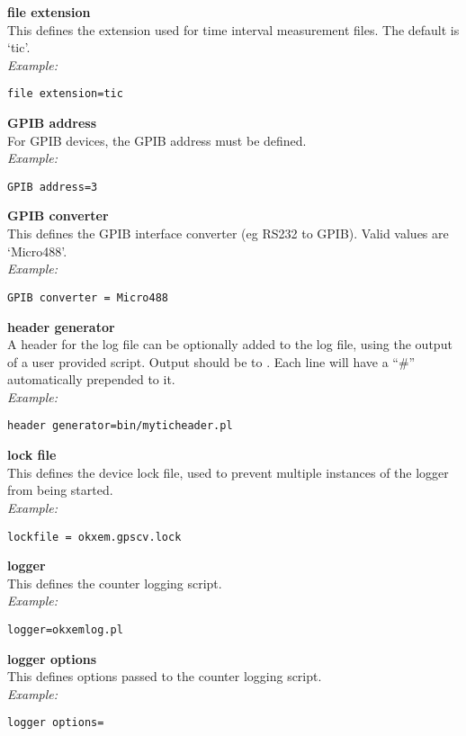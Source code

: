 {\bfseries file extension}\\
This defines the extension used for time interval measurement files.
The default is `tic'.\\
\textit{Example:}
\begin{lstlisting}
file extension=tic
\end{lstlisting}

{\bfseries GPIB address}\\
For GPIB devices, the GPIB address must be defined.\\
\textit{Example:}
\begin{lstlisting}
GPIB address=3
\end{lstlisting}

{\bfseries GPIB converter}\\
This defines the GPIB interface converter (eg RS232 to GPIB).
Valid values are `Micro488'.\\
\textit{Example:}
\begin{lstlisting}
GPIB converter = Micro488
\end{lstlisting}

{\bfseries header generator}\\
A header for the log file can be optionally added to the log file, using the output
of a user provided script. Output should be to .
Each line will have a ``\#'' automatically prepended to it.\\
\textit{Example:}
\begin{lstlisting}
header generator=bin/myticheader.pl
\end{lstlisting}

{\bfseries lock file}\\
This defines the device lock file, used to prevent multiple instances of the logger
from being started.\\
\textit{Example:}
\begin{lstlisting}
lockfile = okxem.gpscv.lock
\end{lstlisting}

{\bfseries logger}\\
This defines the counter logging script.\\
\textit{Example:}
\begin{lstlisting}
logger=okxemlog.pl
\end{lstlisting}

{\bfseries logger options}\\
This defines options passed to the counter logging script.\\
\textit{Example:}
\begin{lstlisting}
logger options=
\end{lstlisting}


